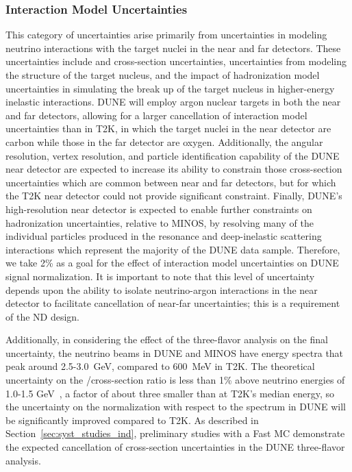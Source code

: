 \subsubsection{Interaction Model Uncertainties}
\label{sec:syst_just_sim}
This category of uncertainties arise primarily from uncertainties in modeling neutrino interactions with the target
nuclei in the near and far detectors. These uncertainties include \nue and \numu cross-section uncertainties,
uncertainties from modeling the structure of the target nucleus, and the impact of
hadronization model uncertainties in simulating the break up of the target nucleus in higher-energy inelastic
interactions. DUNE will employ argon nuclear targets in both the near and far detectors, allowing for a larger
cancellation of interaction model uncertainties than in T2K, in which the target nuclei in the near detector are
carbon while those in the far detector are oxygen. Additionally, the angular resolution, vertex resolution,
and particle identification capability of the DUNE near detector are expected to increase its ability to
constrain those cross-section uncertainties which are common between near and far detectors, but for which
the T2K near detector could not provide significant constraint.
Finally, DUNE's high-resolution near
detector is expected to enable further constraints on hadronization uncertainties, relative to MINOS, by
resolving many of the individual particles produced in the resonance and deep-inelastic scattering interactions
which represent the majority of the DUNE data sample. Therefore, we take 2\% as a goal for the effect of
interaction model uncertainties on DUNE \nue signal normalization. It is important to note that this level of
uncertainty depends upon the ability to isolate neutrino-argon interactions in the near detector to facilitate
cancellation of near-far uncertainties; this is a requirement of the ND design.

Additionally, in considering the effect of the three-flavor analysis on the final uncertainty,
the neutrino beams in DUNE and MINOS have energy
spectra that peak around 2.5-3.0~GeV, compared to 600~MeV in T2K. 
The theoretical uncertainty on the \nue/\numu cross-section ratio is
less than 1\% above neutrino energies of 1.0-1.5 GeV~\cite{Day-McFarland:2012},
a factor of about three smaller than at T2K's median energy,
so the uncertainty on the \nue normalization with respect to the \numu spectrum in DUNE will be
significantly improved compared to T2K. 
As described in Section~\ref{sec:syst_studies_ind}, preliminary studies with a Fast MC demonstrate the
expected cancellation of cross-section uncertainties in the DUNE three-flavor analysis.

